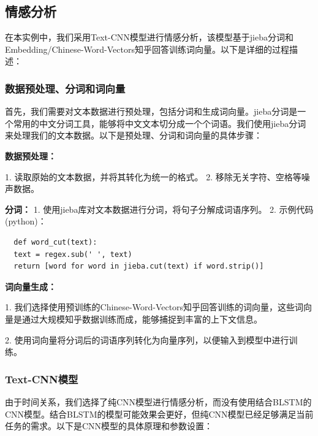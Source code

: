 \documentclass[UTF8,a4paper,15pt,titlepage,oneside]{ctexbook}
\begin{document}
\subsection{情感分析}

在本实例中，我们采用Text-CNN模型进行情感分析，该模型基于jieba分词和Embedding/Chinese-Word-Vectors知乎回答训练词向量。以下是详细的过程描述：

\subsubsection{数据预处理、分词和词向量}

首先，我们需要对文本数据进行预处理，包括分词和生成词向量。jieba分词是一个常用的中文分词工具，能够将中文文本切分成一个个词语。我们使用jieba分词来处理我们的文本数据。以下是预处理、分词和词向量的具体步骤：

\vskip 0.2cm
\noindent
\textbf{数据预处理：}

1. 读取原始的文本数据，并将其转化为统一的格式。
2. 移除无关字符、空格等噪声数据。

\vskip 0.2cm
\noindent
\textbf{分词：}
1. 使用jieba库对文本数据进行分词，将句子分解成词语序列。
2. 示例代码(python)：

\begin{mdframed}[backgroundcolor=darkgray, linecolor=lightgray, linewidth=1pt, innermargin=0.5cm, outermargin=0.5cm, skipbelow=0.1cm]
  \color{white}
  \begin{verbatim}
  def word_cut(text):
  text = regex.sub(' ', text)
  return [word for word in jieba.cut(text) if word.strip()]
\end{verbatim}
  \end{mdframed}

  \vskip 0.2cm
  \noindent
  \textbf{词向量生成：}

1. 我们选择使用预训练的Chinese-Word-Vectors知乎回答训练的词向量，这些词向量是通过大规模知乎数据训练而成，能够捕捉到丰富的上下文信息。

2. 使用词向量将分词后的词语序列转化为向量序列，以便输入到模型中进行训练。

\subsubsection{Text-CNN模型}

由于时间关系，我们选择了纯CNN模型进行情感分析，而没有使用结合BLSTM的CNN模型。结合BLSTM的模型可能效果会更好，但纯CNN模型已经足够满足当前任务的需求。以下是CNN模型的具体原理和参数设置：
\end{document}
